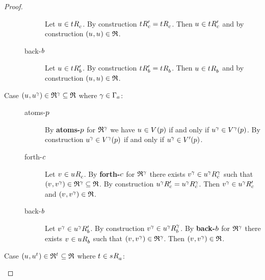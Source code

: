 \begin{proof}
\begin{description}
\begin{description}
                Let $\kStateU \in \kSuccessorsC{\kStateT}$.
                By construction $\kSuccessorsPC{\kStateT} = \kSuccessorsC{\kStateT}$.
                Then $\kStateU \in \kSuccessorsPC{\kStateT}$ and by construction $(\kStateU, \kStateU) \in \refinement$.
            \item[back-$\agentB$]
                Let $\kStateU \in \kSuccessorsPB{\kStateT}$.
                By construction $\kSuccessorsPB{\kStateT} = \kSuccessorsB{\kStateT}$.
                Then $\kStateU \in \kSuccessorsB{\kStateT}$ and by construction $(\kStateU, \kStateU) \in \refinement$.
        \end{description}
    \item[{Case $(\kStateU, \kStateU[\gamma]) \in \refinement^\gamma \subseteq \refinement$ where $\gamma \in \Gamma_\agentA$:}]
        \hfill
        \begin{description}
            \item[atoms-$\atomP$] 
                By {\bf atoms-$\atomP$} for $\refinement^\gamma$ we have $\kStateU \in \kValuation(\atomP)$ if and only if $\kStateU[\gamma] \in \kValuation[\gamma](\atomP)$.
                By construction $\kStateU[\gamma] \in \kValuation[\gamma](\atomP)$ if and only if $\kStateU[\gamma] \in \kValuationP(\atomP)$.
            \item[forth-$\agentC$]
                Let $\kStateV \in \kSuccessorsC{\kStateU}$.
                By {\bf forth-$\agentC$} for $\refinement^\gamma$ there exists $\kStateV[\gamma] \in \kSuccessorsC[\gamma]{\kStateU[\gamma]}$ such that $(\kStateV, \kStateV[\gamma]) \in \refinement^\gamma \subseteq \refinement$.
                By construction $\kSuccessorsPC{\kStateU[\gamma]} = \kSuccessorsC[\gamma]{\kStateU[\gamma]}$.
                Then $\kStateV[\gamma] \in \kSuccessorsPC{\kStateU[\gamma]}$ and $(\kStateV, \kStateV[\gamma]) \in \refinement$.
            \item[back-$\agentB$]
                Let $\kStateV[\gamma] \in \kSuccessorsPB{\kStateU[\gamma]}$.
                By construction $\kStateV[\gamma] \in \kSuccessorsB[\gamma]{\kStateU[\gamma]}$.
                By {\bf back-$\agentB$} for $\refinement^{\gamma}$ there exists $\kStateV \in \kSuccessorsB{\kStateU}$ such that $(\kStateV, \kStateV[\gamma]) \in \refinement^{\gamma}$.
                Then $(\kStateV, \kStateV[\gamma]) \in \refinement$.
        \end{description}
    \item[{Case $(\kStateU, \kStateU[\kStateT]) \in \refinement^{\kStateT} \subseteq \refinement$ where $\kStateT \in \kSuccessorsA{\kStateS}$:}]

\end{description}
\end{proof}
